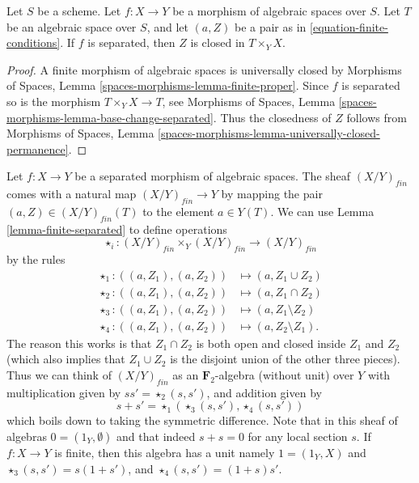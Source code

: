 \begin{lemma}
\label{lemma-finite-separated}
Let $S$ be a scheme.
Let $f : X \to Y$ be a morphism of algebraic spaces over $S$.
Let $T$ be an algebraic space over $S$, and let $(a, Z)$ be
a pair as in \ref{equation-finite-conditions}.
If $f$ is separated, then $Z$ is closed in $T \times_Y X$.
\end{lemma}

\begin{proof}
A finite morphism of algebraic spaces is universally closed by
Morphisms of Spaces, Lemma \ref{spaces-morphisms-lemma-finite-proper}.
Since $f$ is separated so is the morphism $T \times_Y X \to T$, see
Morphisms of Spaces, Lemma \ref{spaces-morphisms-lemma-base-change-separated}.
Thus the closedness of $Z$ follows from
Morphisms of Spaces,
Lemma \ref{spaces-morphisms-lemma-universally-closed-permanence}.
\end{proof}

\begin{remark}
\label{remark-finite-monoid}
Let $f : X \to Y$ be a separated morphism of algebraic spaces.
The sheaf $(X/Y)_{fin}$ comes with a natural map
$(X/Y)_{fin} \to Y$ by mapping the pair $(a, Z) \in (X/Y)_{fin}(T)$
to the element $a \in Y(T)$. We can use
Lemma \ref{lemma-finite-separated}
to define operations
$$
\star_i : (X/Y)_{fin} \times_Y (X/Y)_{fin} \longrightarrow (X/Y)_{fin}
$$
by the rules
\begin{align*}
\star_1 : ((a, Z_1), (a, Z_2)) & \longmapsto (a, Z_1 \cup Z_2) \\
\star_2 : ((a, Z_1), (a, Z_2)) & \longmapsto (a, Z_1 \cap Z_2) \\
\star_3 : ((a, Z_1), (a, Z_2)) & \longmapsto (a, Z_1 \setminus Z_2) \\
\star_4 : ((a, Z_1), (a, Z_2)) & \longmapsto (a, Z_2 \setminus Z_1).
\end{align*}
The reason this works is that $Z_1 \cap Z_2$ is both open and closed
inside $Z_1$ and $Z_2$ (which also implies that $Z_1 \cup Z_2$ is
the disjoint union of the other three pieces).
Thus we can think of $(X/Y)_{fin}$ as an $\mathbf{F}_2$-algebra
(without unit) over $Y$ with multiplication given by
$ss' = \star_2(s, s')$, and addition given by
$$
s + s' = \star_1(\star_3(s, s'), \star_4(s, s'))
$$
which boils down to taking the symmetric difference.
Note that in this sheaf of algebras $0 = (1_Y, \emptyset)$
and that indeed $s + s = 0$ for any local section $s$.
If $f : X \to Y$ is finite, then this algebra has a unit namely
$1 = (1_Y, X)$ and $\star_3(s, s') = s(1 + s')$, and
$\star_4(s, s') = (1 + s)s'$.
\end{remark}

